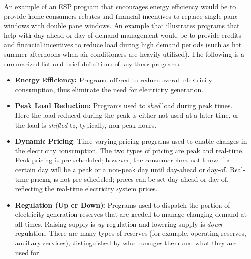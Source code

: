 An example of an ESP program that encourages energy efficiency would be to provide home consumers rebates and financial incentives to replace single pane windows with double pane windows. An example that illustrates programs that help with day-ahead or day-of demand management would be to provide credits and financial incentives to reduce load during high demand periods (such as hot summer afternoons when air conditioners are heavily utilized). The following is a summarized list and brief definitions of key these programs.

\begin{itemize}
\item {\bf Energy Efficiency:} Programs offered to reduce overall electricity consumption, thus eliminate the need for electricity generation.
\item {\bf Peak Load Reduction:} Programs used to \textit{shed} load during peak times. Here the load reduced during the peak is either not used at a later time, or the load is \textit{shifted} to, typically, non-peak hours. 

\item {\bf Dynamic Pricing:} Time varying pricing programs used to enable changes in the electricity consumption. 
The two types of pricing are peak and real-time.  Peak pricing is pre-scheduled; however, the consumer 
does not know if a certain day will be a peak or a non-peak day until day-ahead or day-of.  
Real-time pricing is not pre-scheduled; prices can be set day-ahead or day-of, reflecting the real-time electricity system prices.

\item {\bf Regulation (Up or Down):} Programs used to dispatch the portion of electricity generation reserves that are needed to manage changing demand at all times. Raising supply is \emph{up} regulation and lowering 
supply is \emph{down} regulation. There are many types of reserves (for example, operating reserves, ancillary services), distinguished by who manages them and what they are used for.
\end{itemize}

